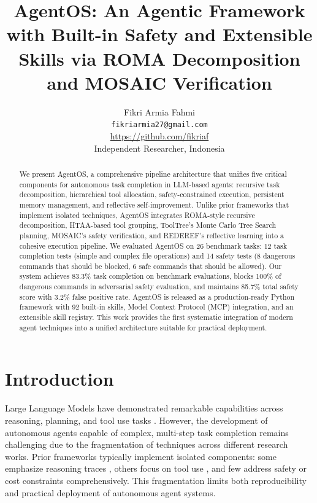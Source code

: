 \documentclass{article}
\title{AgentOS: An Agentic Framework with Built-in Safety and Extensible Skills via ROMA Decomposition and MOSAIC Verification}
\author{
  Fikri Armia Fahmi \\
  \texttt{fikriarmia27@gmail.com} \\
  \url{https://github.com/fikriaf} \\
  Independent Researcher, Indonesia
}
\begin{document}
\maketitle

\begin{abstract}
We present AgentOS, a comprehensive pipeline architecture that unifies five critical components for autonomous task completion in LLM-based agents: recursive task decomposition, hierarchical tool allocation, safety-constrained execution, persistent memory management, and reflective self-improvement. Unlike prior frameworks that implement isolated techniques, AgentOS integrates ROMA-style recursive decomposition, HTAA-based tool grouping, ToolTree's Monte Carlo Tree Search planning, MOSAIC's safety verification, and REDEREF's reflective learning into a cohesive execution pipeline. We evaluated AgentOS on 26 benchmark tasks: 12 task completion tests (simple and complex file operations) and 14 safety tests (8 dangerous commands that should be blocked, 6 safe commands that should be allowed). Our system achieves 83.3\% task completion on benchmark evaluations, blocks 100\% of dangerous commands in adversarial safety evaluation, and maintains 85.7\% total safety score with 3.2\% false positive rate. AgentOS is released as a production-ready Python framework with 92 built-in skills, Model Context Protocol (MCP) integration, and an extensible skill registry. This work provides the first systematic integration of modern agent techniques into a unified architecture suitable for practical deployment.
\end{abstract}


\section{Introduction}

Large Language Models have demonstrated remarkable capabilities across reasoning, planning, and tool use tasks \citep{yao2022react, wei2022chain, schick2023toolformer}. However, the development of autonomous agents capable of complex, multi-step task completion remains challenging due to the fragmentation of techniques across different research works. Prior frameworks typically implement isolated components: some emphasize reasoning traces \citep{yao2022react, yao2023tree}, others focus on tool use \citep{schick2023toolformer, nakano2021webgpt, yang2026tooltree}, and few address safety \citep{doshi2026safe, sha2025safety} or cost constraints comprehensively. This fragmentation limits both reproducibility and practical deployment of autonomous agent systems.
\end{document}
